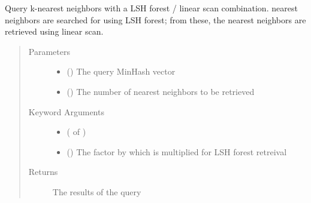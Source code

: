 \documentclass[letterpaper,10pt,english]{sphinxmanual}
\begin{document}
\begin{fulllineitems}
\begin{fulllineitems}
\end{fulllineitems}


\begin{fulllineitems}
\label{\detokenize{documentation:tmap.LSHForest.query_linear_scan_exclude}}
Query k-nearest neighbors with a LSH forest / linear scan combination.  nearest neighbors are searched for using LSH forest; from these, the  nearest neighbors are retrieved using linear scan.
\begin{quote}\begin{description}
\item[{Parameters}] \leavevmode\begin{itemize}
\item {} 
 () \textendash{} The query MinHash vector

\item {} 
 () \textendash{} The number of nearest neighbors to be retrieved

\end{itemize}

\item[{Keyword Arguments}] \leavevmode\begin{itemize}
\item {} 
 ( of ) \textendash{} 

\item {} 
 () \textendash{} The factor by which  is multiplied for LSH forest retreival

\end{itemize}

\item[{Returns}] \leavevmode
The results of the query


\end{description}
\end{quote}
\end{fulllineitems}
\end{fulllineitems}
\end{document}
